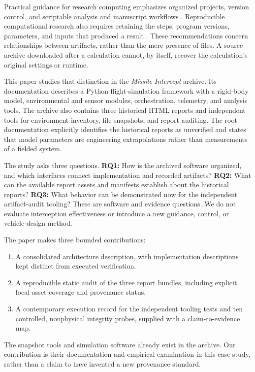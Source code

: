 \documentclass[11pt,a4paper]{article}
\begin{document}
Practical guidance for research computing emphasizes organized projects, version control, and scriptable analysis and manuscript workflows \citep{wilson2017}. Reproducible computational research also requires retaining the steps, program versions, parameters, and inputs that produced a result \citep{sandve2013}. These recommendations concern relationships between artifacts, rather than the mere presence of files. A source archive downloaded after a calculation cannot, by itself, recover the calculation's original settings or runtime.

This paper studies that distinction in the \emph{Missile Intercept} archive. Its documentation describes a Python flight-simulation framework with a rigid-body model, environmental and sensor modules, orchestration, telemetry, and analysis tools. The archive also contains three historical HTML reports and independent tools for environment inventory, file snapshots, and report auditing. The root documentation explicitly identifies the historical reports as unverified and states that model parameters are engineering extrapolations rather than measurements of a fielded system.

The study asks three questions. \textbf{RQ1:} How is the archived software organized, and which interfaces connect implementation and recorded artifacts? \textbf{RQ2:} What can the available report assets and manifests establish about the historical reports? \textbf{RQ3:} What behavior can be demonstrated now for the independent artifact-audit tooling? These are software and evidence questions. We do not evaluate interception effectiveness or introduce a new guidance, control, or vehicle-design method.

The paper makes three bounded contributions:
\begin{enumerate}
  \item A consolidated architecture description, with implementation descriptions kept distinct from executed verification.
  \item A reproducible static audit of the three report bundles, including explicit local-asset coverage and provenance status.
  \item A contemporary execution record for the independent tooling tests and ten controlled, nonphysical integrity probes, supplied with a claim-to-evidence map.
\end{enumerate}
The snapshot tools and simulation software already exist in the archive. Our contribution is their documentation and empirical examination in this case study, rather than a claim to have invented a new provenance standard.
\end{document}
